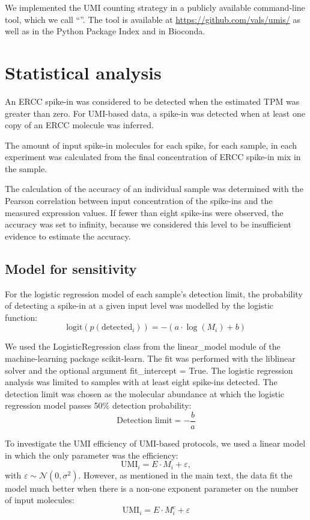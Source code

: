 We implemented the UMI counting strategy in a publicly available command-line tool, which we call ``''. The tool is available at \url{https://github.com/vals/umis/} as well as in the Python Package Index and in Bioconda.

\section{Statistical analysis}

An ERCC spike-in was considered to be detected when the estimated TPM was greater than zero. For UMI-based data, a spike-in was detected when at least one copy of an ERCC molecule was inferred.

The amount of input spike-in molecules for each spike, for each sample, in each experiment was calculated from the final concentration of ERCC spike-in mix in the sample.

The calculation of the accuracy of an individual sample was determined with the Pearson correlation between input concentration of the spike-ins and the measured expression values. If fewer than eight spike-ins were observed, the accuracy was set to infinity, because we considered this level to be insufficient evidence to estimate the accuracy.

\subsection{Model for sensitivity}

For the logistic regression model of each sample’s detection limit, the probability of detecting a spike-in at a given input level was modelled by the logistic function:
\[
    \text{logit}(p(\text{detected}_i)) = -(a \cdot \log(M_i) + b)
\]

We used the LogisticRegression class from the linear\_model module of the machine-learning package scikit-learn. The fit was performed with the liblinear solver and the optional argument fit\_intercept = True. The logistic regression analysis was limited to samples with at least eight spike-ins detected. The detection limit was chosen as the molecular abundance at which the logistic regression model passes 50\% detection probability:
\[
    \text{Detection limit} = -\frac{b}{a}
\]

To investigate the UMI efficiency of UMI-based protocols, we used a linear model in which the only parameter was the efficiency:
\[
    \text{UMI}_i = E \cdot M_i + \varepsilon,
\]
with \( \varepsilon \sim \mathcal{N}(0, \sigma^2) \). However, as mentioned in the main text, the data fit the model much better when there is a non-one exponent parameter on the number of input molecules:
\[
    \text{UMI}_i = E \cdot M_i^c + \varepsilon
\]

